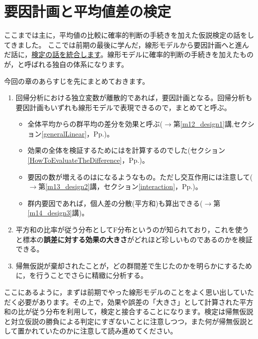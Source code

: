 \documentclass{ltjbook}
\begin{document}
\chapter{要因計画と平均値差の検定}
\label{m21_anova}
ここまでは主に，平均値の比較に確率的判断の手続きを加えた仮説検定の話をしてきました。
ここでは前期の最後に学んだ，線形モデルから要因計画へと進んだ話に，\underline{検定の話を統合します}。線形モデルに確率的判断の手続きを加えたものが，と呼ばれる独自の体系になります。

今回の章のあらすじを先にまとめておきます。
\begin{enumerate}
	\item 回帰分析における独立変数が離散的であれば，要因計画となる。回帰分析も要因計画もいずれも線形モデルで表現できるので，まとめてと呼ぶ。
	      \begin{itemize}
		      \item 全体平均からの群平均の差分を効果と呼ぶ($\to$第\ref{m12_design1}講,セクション\ref{generalLinear}，Pp.\pageref{generalLinear})。
		      \item 効果の全体を検証するためにはを計算するのでした(セクション\ref{HowToEvaluateTheDifference}，Pp.\pageref{HowToEvaluateTheDifference})。
		      \item 要因の数が増えるのはになるようなもの。ただし交互作用には注意して($\to$第\ref{m13_design2}講，セクション\ref{interaction}，Pp.\pageref{interaction})。
		      \item 群内要因であれば，個人差の分散(平方和)も算出できる($\to$第\ref{m14_design3}講)。
	      \end{itemize}
	\item 平方和の比率が従う分布としてF分布というのが知られており，これを使うと標本の\textbf{誤差に対する効果の大きさ}がどれほど珍しいものであるのかを検証できる。
	\item 帰無仮説が棄却されたことが，どの群間差で生じたのかを明らかにするために，を行うことでさらに精緻に分析する。
\end{enumerate}

ここにあるように，まずは前期でやった線形モデルのことをよく思い出していただく必要があります。その上で，効果や誤差の「大きさ」として計算された平方和の比が従う分布を利用して，検定と接合することになります。検定は帰無仮説と対立仮説の勝負による判定にすぎないことに注意しつつ，また何が帰無仮説として置かれていたのかに注意して読み進めてください。
\end{document}
